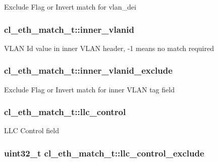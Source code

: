 Exclude Flag or Invert match for vlan\-\_\-dei \hypertarget{structcl__eth__match__t_a4cde4e74ac7e5b305a893159f6de939c}{
\subsubsection[{inner\-\_\-vlanid}]{ cl\-\_\-eth\-\_\-match\-\_\-t\-::inner\-\_\-vlanid}}\label{structcl__eth__match__t_a4cde4e74ac7e5b305a893159f6de939c}
V\-L\-A\-N Id value in inner V\-L\-A\-N header, -\/1 means no match required \hypertarget{structcl__eth__match__t_a43a9949e1abef1fa0669c88782fdcd9d}{
\subsubsection[{inner\-\_\-vlanid\-\_\-exclude}]{ cl\-\_\-eth\-\_\-match\-\_\-t\-::inner\-\_\-vlanid\-\_\-exclude}}\label{structcl__eth__match__t_a43a9949e1abef1fa0669c88782fdcd9d}
Exclude Flag or Invert match for inner V\-L\-A\-N tag field \hypertarget{structcl__eth__match__t_aa4091325594c6a27181f4be25be09b88}{
\subsubsection[{llc\-\_\-control}]{ cl\-\_\-eth\-\_\-match\-\_\-t\-::llc\-\_\-control}}\label{structcl__eth__match__t_aa4091325594c6a27181f4be25be09b88}
L\-L\-C Control field \hypertarget{structcl__eth__match__t_afc8ec2cea0ef5c13a10b7dcdf4b50158}{
\subsubsection[{llc\-\_\-control\-\_\-exclude}]{\setlength{\rightskip}{0pt plus 5cm}uint32\-\_\-t cl\-\_\-eth\-\_\-match\-\_\-t\-::llc\-\_\-control\-\_\-exclude}}\label{structcl__eth__match__t_afc8ec2cea0ef5c13a10b7dcdf4b50158}
